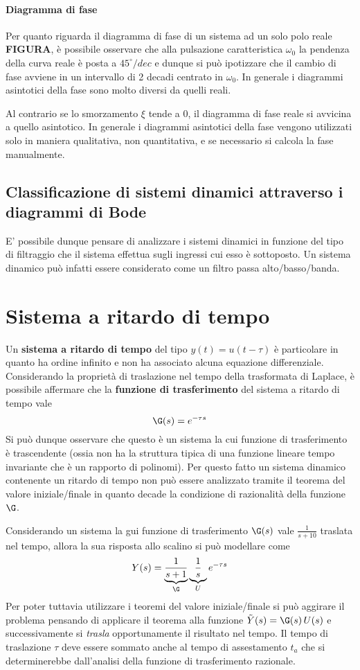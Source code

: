 			
			\paragraph{Diagramma di fase} Per quanto riguarda il diagramma di fase di un sistema ad un solo polo reale \textbf{FIGURA}, è possibile osservare che alla pulsazione caratteristica $\omega_0$ la pendenza  della curva reale è posta a $45^\circ/dec$ e dunque si può ipotizzare che il cambio di fase avviene in un intervallo di 2 decadi centrato in $\omega_0$. In generale i diagrammi asintotici della fase sono molto diversi da quelli reali.
			
			Al contrario se lo smorzamento $\xi$ tende a $0$, il diagramma di fase reale si avvicina a quello asintotico. In generale i diagrammi asintotici della fase vengono utilizzati solo in maniera qualitativa, non quantitativa, e se necessario si calcola la fase manualmente.
			
	\subsection{Classificazione di sistemi dinamici attraverso i diagrammi di Bode}
		E' possibile dunque pensare di analizzare i sistemi dinamici in funzione del tipo di filtraggio che il sistema effettua sugli ingressi cui esso è sottoposto. Un sistema dinamico può infatti essere considerato come un filtro passa alto/basso/banda.
			
			
	
\section{Sistema a ritardo di tempo}
	Un \textbf{sistema a ritardo di tempo} del tipo $y(t) = u(t-\tau)$ è particolare in quanto ha ordine infinito e non ha associato alcuna equazione differenziale. Considerando la proprietà di traslazione nel tempo della trasformata di Laplace, è possibile affermare che la \textbf{funzione di trasferimento} del sistema a ritardo di tempo vale
	\[ \G(s) = e^{-\tau s}  \]
	Si può dunque osservare che questo è un sistema la cui funzione di trasferimento è trascendente (ossia non ha la struttura tipica di una funzione lineare tempo invariante che è un rapporto di polinomi). Per questo fatto un sistema dinamico contenente un ritardo di tempo non può essere analizzato tramite il teorema del valore iniziale/finale in quanto decade la condizione di razionalità della funzione $\G$.
	
	Considerando un sistema la gui funzione di trasferimento $\G(s)$ vale $\frac 1  {s+10} $ traslata nel tempo, allora la sua risposta allo scalino si può modellare come
	\[  Y(s) = \underbrace{\frac 1 {s+1}}_\G \underbrace{\frac 1 s}_U  e^{-\tau s} \]
	Per poter tuttavia utilizzare i teoremi del valore iniziale/finale si può aggirare il problema pensando di applicare il teorema alla funzione $\tilde Y(s) = \G (s)\, U(s)$ e successivamente si \textit{trasla} opportunamente il risultato nel tempo. Il tempo di traslazione $\tau$ deve essere sommato anche al tempo di assestamento $t_a$ che si determinerebbe dall'analisi della funzione di trasferimento razionale.
	
